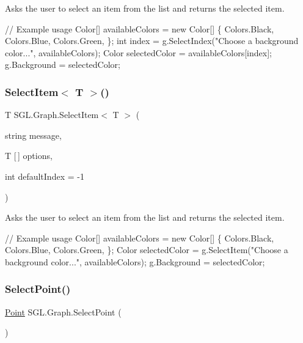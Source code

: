 Asks the user to select an item from the list and returns the selected item. 


\begin{DoxyCode}
\textcolor{comment}{// Example usage}
Color[] availableColors = \textcolor{keyword}{new} Color[] \{
    Colors.Black,
    Colors.Blue,
    Colors.Green,
\};
\textcolor{keywordtype}{int} index = g.SelectIndex(\textcolor{stringliteral}{"Choose a background color..."}, availableColors);
Color selectedColor = availableColors[index];
g.Background = selectedColor;
\end{DoxyCode}
 \mbox{\label{class_s_g_l_1_1_graph_a482da34c25dc49ec1fe1aed288d2807a}} 
\subsubsection{\texorpdfstring{Select\+Item$<$ T $>$()}{SelectItem< T >()}}
{\footnotesize\ttfamily T S\+G\+L.\+Graph.\+Select\+Item$<$ T $>$ (\begin{DoxyParamCaption}\item[{string}]{message,  }\item[{T \mbox{[}$\,$\mbox{]}}]{options,  }\item[{int}]{default\+Index = {\ttfamily -\/1} }\end{DoxyParamCaption})\hspace{0.3cm}{\ttfamily [inline]}}



Asks the user to select an item from the list and returns the selected item. 


\begin{DoxyCode}
\textcolor{comment}{// Example usage}
Color[] availableColors = \textcolor{keyword}{new} Color[] \{
    Colors.Black,
    Colors.Blue,
    Colors.Green,
\};
Color selectedColor = g.SelectItem(\textcolor{stringliteral}{"Choose a background color..."}, availableColors);
g.Background = selectedColor;
\end{DoxyCode}
 \mbox{\label{class_s_g_l_1_1_graph_a02daa8a4a7e540677d76e9a0ac40039d}} 
\subsubsection{\texorpdfstring{Select\+Point()}{SelectPoint()}}
{\footnotesize\ttfamily \mbox{\hyperlink{struct_s_g_l_1_1_point}{Point}} S\+G\+L.\+Graph.\+Select\+Point (\begin{DoxyParamCaption}{ }\end{DoxyParamCaption})\hspace{0.3cm}{\ttfamily [inline]}}




